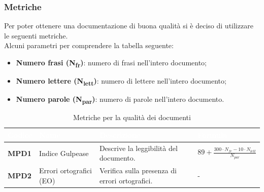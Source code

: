 \subsubsection{Metriche}
Per poter ottenere una documentazione di buona qualità si è deciso di utilizzare le seguenti metriche.\\
Alcuni parametri per comprendere la tabella seguente:
	\begin{itemize}
		\item \textbf{Numero frasi (N\textsubscript{fr})}: numero di frasi nell'intero documento;
		\item \textbf{Numero lettere (N\textsubscript{lett})}: numero di lettere nell'intero documento;
		\item \textbf{Numero parole (N\textsubscript{par})}: numero di parole nell'intero documento.
	\end{itemize}
\renewcommand{\arraystretch}{1.5}
\renewcommand\extrarowheight{1.5pt}
\begin{longtable}{C{1.5cm} C{4.5cm} C{5.5cm} C{5cm}}
		\textcolor{white}{\textbf{Codice}} & 
		\textcolor{white}{\textbf{Nome}} & 
		\textcolor{white}{\textbf{Descrizione}} & 
		\textcolor{white}{\textbf{Formula}} \\
		\endfirsthead
	    \endfoot
	    \caption{Metriche per la qualità dei documenti}
	    \endlastfoot
		\hline
		\textbf{MPD1} & 
		Indice Gulpease & 
		Descrive la leggibilità del documento. & 
		$ 89 + \frac{300 \cdot N_{fr} - 10 \cdot N_{lett}}{N_{par}}$ \\
		\textbf{MPD2} & 
		Errori ortografici (EO) & 
		Verifica sulla presenza di errori ortografici. & 
		- \\
\end{longtable}
